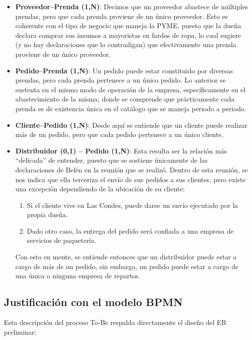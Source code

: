 \documentclass[11pt,letterpaper]{article}
\begin{document}
\begin{itemize}
    \item \textbf{Proveedor--Prenda (1,N)}: Decimos que un proveedor abastece de múltiples prendas, pero que cada prenda proviene de un único proveedor. Esto es coherente con el tipo de negocio que maneja la PYME, puesto que la dueña declara comprar sus insumos a mayoristas en fardos de ropa, lo cual sugiere (y no hay declaraciones que lo contradigan) que efectivamente una prenda proviene de un único proveedor.
    \item \textbf{Pedido--Prenda (1,N)}: Un pedido puede estar constituido por diversas prendas, pero cada prenda pertenece a un único pedido. Lo anterior se sustenta en el mismo modo de operación de la empresa, específicamente en el abastecimiento de la misma, donde se comprende que prácticamente cada prenda es de existencia única en el catálogo que se maneja periodo a periodo.
    \item \textbf{Cliente--Pedido (1,N)}: Desde aquí se entiende que un cliente puede realizar más de un pedido, pero que cada pedido pertenece a un único cliente.
    \item \textbf{Distribuidor (0,1) -- Pedido (1,N)}: Esta resulta ser la relación más ``delicada'' de entender, puesto que se sostiene únicamente de las declaraciones de Belén en la reunión que se realizó. Dentro de esta reunión, se nos indica que ella terceriza el envío de sus pedidos a sus clientes, pero existe una excepción dependiendo de la ubicación de su cliente:
    \begin{enumerate}
        \item Si el cliente vive en Las Condes, puede darse un envío ejecutado por la propia dueña.
        \item Dado otro caso, la entrega del pedido será confiada a una empresa de servicios de paquetería.
    \end{enumerate}
    Con esto en mente, se entiende entonces que un distribuidor puede estar a cargo de más de un pedido, sin embargo, un pedido puede estar a cargo de una única o ninguna empresa de repartos.
\end{itemize}

\subsection*{Justificación con el modelo BPMN}

Esta descripción del proceso To-Be respalda directamente el diseño del ER preliminar:
\end{document}
